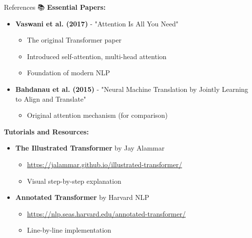 \documentclass[aspectratio=169]{beamer}
\begin{document}
\begin{frame}[shrink=10]{References 📚}
\textbf{Essential Papers:}

\vspace{0.5em}

\begin{itemize}\setlength{\itemsep}{0pt}
    \item \textbf{Vaswani et al. (2017)} - "Attention Is All You Need"
    \begin{itemize}\setlength{\itemsep}{0pt}
        \item The original Transformer paper
        \item Introduced self-attention, multi-head attention
        \item Foundation of modern NLP
    \end{itemize}

    \vspace{0.3em}

    \item \textbf{Bahdanau et al. (2015)} - "Neural Machine Translation by Jointly Learning to Align and Translate"
    \begin{itemize}\setlength{\itemsep}{0pt}
        \item Original attention mechanism (for comparison)
    \end{itemize}
\end{itemize}

\vspace{0.5em}

\textbf{Tutorials and Resources:}
\begin{itemize}\setlength{\itemsep}{0pt}
    \item \textbf{The Illustrated Transformer} by Jay Alammar
    \begin{itemize}\setlength{\itemsep}{0pt}
        \item \url{https://jalammar.github.io/illustrated-transformer/}
        \item Visual step-by-step explanation
    \end{itemize}

    \vspace{0.3em}

    \item \textbf{Annotated Transformer} by Harvard NLP
    \begin{itemize}\setlength{\itemsep}{0pt}
        \item \url{https://nlp.seas.harvard.edu/annotated-transformer/}
        \item Line-by-line implementation
    \end{itemize}


\end{itemize}
\end{frame}
\end{document}
